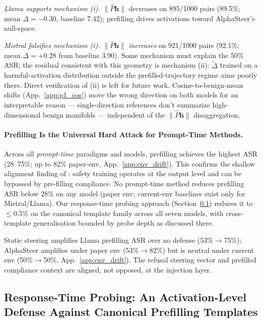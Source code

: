\documentclass{article}
\begin{document}
\emph{Llama supports mechanism (i).} $\|\hat{P}\mathbf{h}\|$ decreases on 895/1000 pairs (89.5\%; mean $\Delta = -0.30$, baseline 7.42); prefilling drives activations toward AlphaSteer's null-space.

\emph{Mistral falsifies mechanism (i).} $\|\hat{P}\mathbf{h}\|$ \emph{increases} on 921/1000 pairs (92.1\%; mean $\Delta = +0.28$ from baseline 3.90). Some mechanism must explain the 50\% ASR; the residual consistent with this geometry is mechanism (ii): $\tilde{\Delta}$ trained on a harmful-activation distribution outside the prefilled-trajectory regime aims poorly there. Direct verification of (ii) is left for future work. Cosine-to-benign-mean shifts (App.~\ref{app:p1_cos}) move the wrong direction on both models for an interpretable reason --- single-direction references don't summarize high-dimensional benign manifolds --- independent of the $\|\hat{P}\mathbf{h}\|$ disaggregation.

\paragraph{Prefilling Is the Universal Hard Attack for Prompt-Time Methods.}
Across all \emph{prompt-time} paradigms and models, prefilling achieves the highest ASR (28--75\%; up to 82\% paper-env, App.~\ref{app:env_drift}). This confirms the shallow alignment finding of \citet{qi2026safety}: safety training operates at the output level and can be bypassed by pre-filling compliance. No prompt-time method reduces prefilling ASR below 28\% on any model (paper env; current-env baselines exist only for Mistral/Llama). Our response-time probing approach (Section~\ref{sec:response_probe}) reduces it to $\leq 0.5\%$ on the canonical template family across all seven models, with cross-template generalisation bounded by probe depth as discussed there.

Static steering amplifies Llama prefilling ASR over no defense (53\%$\to$75\%); AlphaSteer amplifies under paper env (53\%$\to$82\%) but is neutral under current env (50\%$\to$50\%, App.~\ref{app:env_drift}). The refusal steering vector and prefilled compliance context are aligned, not opposed, at the injection layer.

\subsection{Response-Time Probing: An Activation-Level Defense Against Canonical Prefilling Templates}
\label{sec:response_probe}
\end{document}
